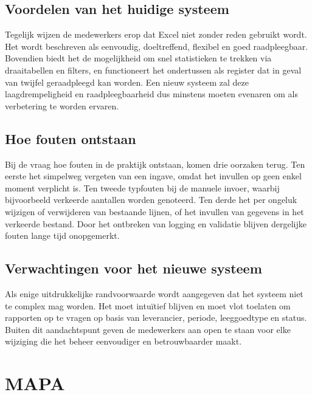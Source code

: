 \subsection{Voordelen van het huidige systeem}

Tegelijk wijzen de medewerkers erop dat Excel niet zonder reden gebruikt wordt. Het wordt beschreven als eenvoudig, doeltreffend, flexibel en goed raadpleegbaar. Bovendien biedt het de mogelijkheid om snel statistieken te trekken via draaitabellen en filters, en functioneert het ondertussen als register dat in geval van twijfel geraadpleegd kan worden. Een nieuw systeem zal deze laagdrempeligheid en raadpleegbaarheid dus minstens moeten evenaren om als verbetering te worden ervaren.

\subsection{Hoe fouten ontstaan}

Bij de vraag hoe fouten in de praktijk ontstaan, komen drie oorzaken terug. Ten eerste het simpelweg vergeten van een ingave, omdat het invullen op geen enkel moment verplicht is. Ten tweede typfouten bij de manuele invoer, waarbij bijvoorbeeld verkeerde aantallen worden genoteerd. Ten derde het per ongeluk wijzigen of verwijderen van bestaande lijnen, of het invullen van gegevens in het verkeerde bestand. Door het ontbreken van logging en validatie blijven dergelijke fouten lange tijd onopgemerkt.

\subsection{Verwachtingen voor het nieuwe systeem}

Als enige uitdrukkelijke randvoorwaarde wordt aangegeven dat het systeem niet te complex mag worden. Het moet intuïtief blijven en moet vlot toelaten om rapporten op te vragen op basis van leverancier, periode, leeggoedtype en status. Buiten dit aandachtspunt geven de medewerkers aan open te staan voor elke wijziging die het beheer eenvoudiger en betrouwbaarder maakt.

\section{MAPA}

